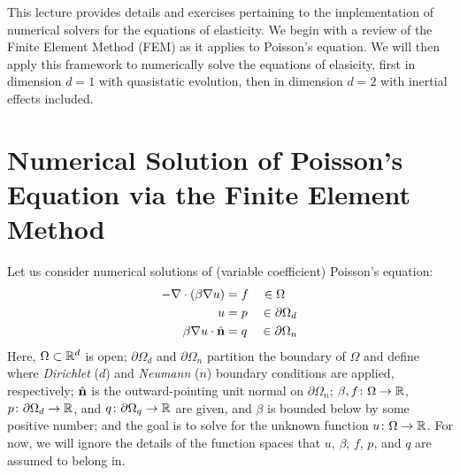 
This lecture provides details and exercises pertaining to the implementation of numerical solvers for the equations of elasticity. We begin with a review of the Finite Element Method (FEM) as it applies to Poisson's equation. We will then apply this framework to numerically solve the equations of elasicity, first in dimension $d = 1$ with quasistatic evolution, then in dimension $d = 2$ with inertial effects included.

\section{Numerical Solution of Poisson's Equation via the Finite Element Method}

Let us consider numerical solutions of (variable coefficient) Poisson's equation:
\begin{subequations}\label{eq:poisson.strong}
\begin{align}
-\nabla \cdot \left( \beta \nabla u \right) & = f \quad \in \Omega \\
u & = p \quad \in \partial \Omega_d \\
\beta \nabla u \cdot \hat{\mathbf{n}} & = q \quad \in \partial \Omega_n
\end{align}
\end{subequations}
Here, $\Omega \subset \mathbb{R}^d$ is open; $\partial \Omega_d$ and $\partial \Omega_n$ partition the boundary of $\Omega$ and define where \emph{Dirichlet} ($d$) and \emph{Neumann} ($n$) boundary conditions are applied, respectively; $\hat{\mathbf{n}}$ is the outward-pointing unit normal on $\partial \Omega_n$; $\beta, f \colon \Omega \to \mathbb{R}$, $p \colon \partial \Omega_d \to \mathbb{R}$, and $q \colon \partial \Omega_q \to \mathbb{R}$ are given, and $\beta$ is bounded below by some positive number; and the goal is to solve for the unknown function $u \colon \Omega \to \mathbb{R}$. For now, we will ignore the details of the function spaces that $u$, $\beta$, $f$, $p$, and $q$ are assumed to belong in.

